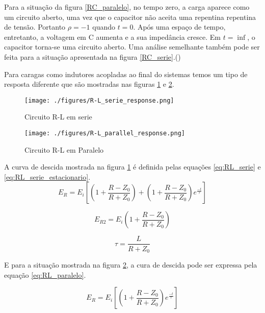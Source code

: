 Para a situação da figura \ref{RC_paralelo}, no tempo zero, a carga aparece como um circuito aberto, uma vez que o capacitor não aceita uma repentina repentina de tensão. Portanto $\rho = -1$ quando $t =0$. Após uma espaço de tempo, entretanto, a voltagem em C aumenta e a sua impedância cresce. Em $ t = \inf$, o capacitor torna-se uma circuito aberto. Uma análise semelhante também pode ser feita para a situação apresentada na figura \ref{RC_serie}.(\cite{agilent})

Para caragas como indutores acopladas ao final do sistemas temos um tipo de resposta diferente que são mostradas nas figuras \ref{RL_serie} e \ref{RL_paralelo}.

\begin{figure}[htb!]
	\begin{center}
		\texttt{[image: ./figures/R-L\_serie\_response.png]}
		\caption{Circuito R-L em serie}
		\label{RL_serie}
	\end{center}
\end{figure}

\begin{figure}[htb!]
	\begin{center}
		\texttt{[image: ./figures/R-L\_parallel\_response.png]}
		\caption{Circuito R-L em Paralelo}
		\label{RL_paralelo}
	\end{center}
\end{figure}

A curva de descida mostrada na figura \ref{RL_serie} é definida pelas equações \ref{eq:RL_serie} e \ref{eq:RL_serie_estacionario}.
%
\begin{equation}
\label{eq:RL_serie}
E_R = E_i \left[\left( 1 + \frac{R - Z_0}{R + Z_0}\right) + \left( 1 + \frac{R - Z_0}{R + Z_0}\right) e^{\frac{-t}{\tau}}\right]
\end{equation}

\begin{equation}
\label{eq:RL_serie_estacionario}
E_{R2} =  E_i \left( 1 + \frac{R - Z_0}{R + Z_0}\right) 
\end{equation}

\begin{equation}
\label{eq:tau_RL}
\tau = \frac{L}{R + Z_0}
\end{equation}

E para a situação mostrada na figura \ref{RL_paralelo}, a cura de descida pode ser expressa pela equação \ref{eq:RL_paralelo}.

\begin{equation}
\label{eq:RL_paralelo}
E_R = E_i\left[\left( 1 + \frac{R-Z_0}{R+Z_0}\right)e^{\frac{-t}{\tau}}\right]
\end{equation}


